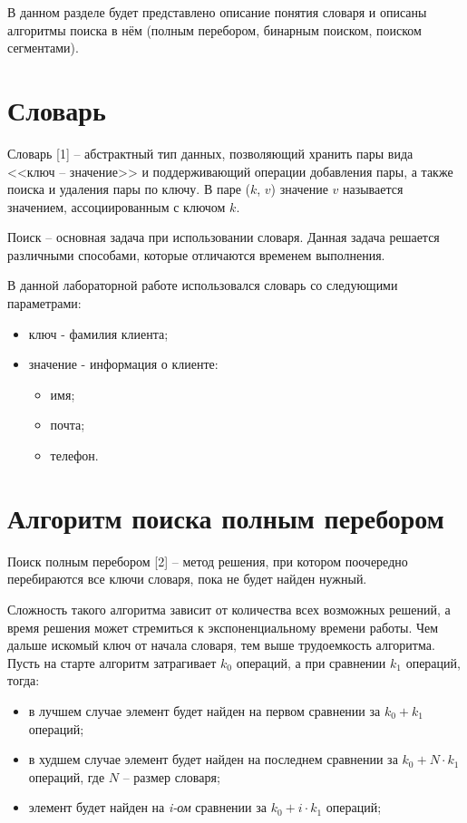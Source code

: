 \documentclass[a4paper,14pt, unknownkeysallowed]{extreport}
\begin{document}
В данном разделе будет представлено описание понятия словаря и описаны алгоритмы поиска в нём (полным перебором, бинарным поиском, поиском сегментами).

\section{Словарь}

Словарь [1] -- абстрактный тип данных, позволяющий хранить пары вида <<ключ -- значение>> и поддерживающий операции добавления пары, а также поиска и удаления пары по ключу.
В паре ($k$, $v$) значение $v$ называется значением, ассоциированным с ключом $k$.

Поиск -- основная задача при использовании словаря. Данная задача решается различными способами, которые отличаются временем выполнения.

В данной лабораторной работе использовался словарь со  следующими параметрами:

\begin{itemize}
	\item ключ - фамилия клиента;
	\item значение - информация о клиенте:
	\begin{itemize}
		\item имя;
		\item почта;
		\item телефон.
	\end{itemize}
\end{itemize}

\section{Алгоритм поиска полным перебором}

Поиск полным перебором [2] -- метод решения, при котором поочередно перебираются все ключи словаря, пока не будет найден нужный.

Сложность такого алгоритма зависит от количества всех возможных решений, а время решения может стремиться к экспоненциальному времени работы.
Чем дальше искомый ключ от начала словаря, тем выше трудоемкость алгоритма. Пусть на старте алгоритм затрагивает $k_0$ операций, а при сравнении $k_1$ операций, тогда:
\begin{itemize}
	\item в лучшем случае элемент будет найден на первом сравнении за $k_0 + k_1$ операций;
	\item в худшем случае элемент будет найден на последнем сравнении за $k_0 +  N \cdot k_1$ операций, где $N$ -- размер словаря;
	\item элемент будет найден на \textit{i-ом} сравнении за $k_0 + i \cdot k_1$ операций;
\end{itemize}
\end{document}
